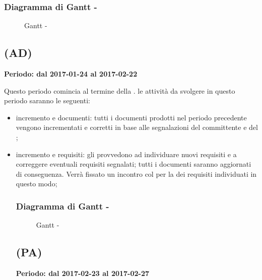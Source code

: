 \documentclass[./PianoDiProgetto.tex]{subfiles}
\begin{document}
  \subsubsection{Diagramma di Gantt - \PerAR}
    \begin{figure}[!h]
    \centering
    \caption{Gantt - \PerAR}
    \end{figure}

	\subsection{\PerAD{} (AD)}
  \textbf{Periodo: dal 2017-01-24 al 2017-02-22}

  Questo periodo comincia al termine della \PerAR.  le attività da svolgere in questo periodo saranno le seguenti:
  \begin{itemize}
    \item incremento e  documenti: tutti i documenti prodotti nel periodo precedente vengono incrementati e corretti in base alle segnalazioni del committente e del ;
    \item incremento e  requisiti:  gli \ANP provvedono ad individuare nuovi requisiti e a correggere eventuali requisiti segnalati; tutti i documenti saranno aggiornati di conseguenza. Verrà fissato un incontro col  per la  dei requisiti individuati in questo modo;
  \subsubsection{Diagramma di Gantt - \PerAD}
    \begin{figure}[!h]
    \centering
    \caption{Gantt - \PerAD}
    \end{figure}

  \subsection{\PerPA{} (PA)}
  \textbf{Periodo: dal 2017-02-23 al 2017-02-27}


\end{itemize}
\end{document}
